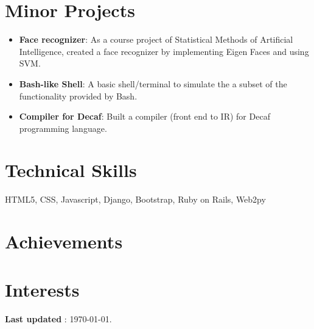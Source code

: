 \documentclass[11pt,a4paper,roman]{moderncv} %
\begin{document}
\section{Minor Projects}

\begin{itemize}

\item {\bfseries Face recognizer}: As a course project of Statistical Methods of Artificial Intelligence, created a face recognizer by implementing Eigen Faces and using SVM.
\item {\bfseries Bash-like Shell}: A basic shell/terminal to simulate the a subset of the functionality provided by Bash.
\item {\bfseries Compiler for Decaf}: Built a compiler (front end to IR) for Decaf programming language.

\end{itemize}


\section{\bfseries{Technical Skills}}

 {HTML5, CSS, Javascript, Django, Bootstrap, Ruby on Rails,  Web2py}


\section{\bfseries{Achievements}}



\section{\bfseries{Interests}}


\centerline{\small{{\bfseries Last updated} : \today.}}
\end{document}
